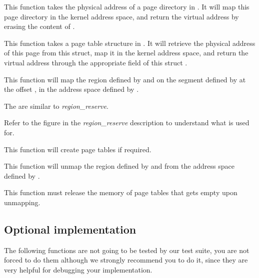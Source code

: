 {
  This function takes the physical address of a page directory in .
  It will map this page directory in the kernel address space, and return
  the virtual address by erasing the content of .
}

{
  This function takes a page table structure in . It will retrieve
  the physical address of this page from this struct, map it in the kernel address
  space, and return the virtual address through the appropriate field of this
  struct .
}

{
  This function will map the region defined by  and 
  on the segment defined by  at the offset , in the
  address space defined by .
  
  \-

  The  are similar to \emph{region\_reserve}.

  \-

  Refer to the figure in the \emph{region\_reserve} description to understand what
   is used for.

  \-

  This function will create page tables if required.
}

{
  This function will unmap the region defined by  and 
  from the address space defined by .

  \-

  This function must release the memory of page tables that gets empty upon unmapping.
}

\subsection*{Optional implementation}

The following functions are not going to be tested by our test suite, you are
not forced to do them although we strongly recommend you to do it, since they
are very helpful for debugging your implementation.

